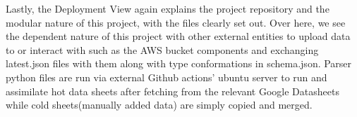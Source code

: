 Lastly, the Deployment View again explains the project repository and the modular nature of this project, with the files clearly set out. Over here, we see the dependent nature of this project with other external entities to upload data to or interact with such as the AWS bucket components and exchanging latest.json files with them along with type conformations in schema.json. Parser python files are run via external Github actions' ubuntu server to run and assimilate hot data sheets after fetching from the relevant Google Datasheets while cold sheets(manually added data) are simply copied and merged.
